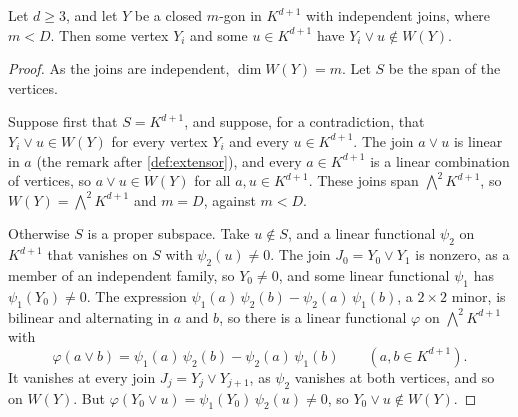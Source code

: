 \begin{lemma}
  \label{lem:pencil-d-polygon-star}
  \leanok
  Let $d \ge 3$, and let $Y$ be a closed $m$-gon in $K^{d+1}$ with
  independent joins, where $m < D$. Then some vertex $Y_i$ and some
  $u \in K^{d+1}$ have $Y_i \vee u \notin W(Y)$.
\end{lemma}
\begin{proof}
  \leanok
  As the joins are independent, $\dim W(Y) = m$. Let $S$ be the span of
  the vertices.

  Suppose first that $S = K^{d+1}$, and suppose, for a contradiction,
  that $Y_i \vee u \in W(Y)$ for every vertex $Y_i$ and every
  $u \in K^{d+1}$. The join $a \vee u$ is linear in $a$ (the remark after
  \cref{def:extensor}), and every $a \in K^{d+1}$ is a linear combination
  of vertices, so $a \vee u \in W(Y)$ for all $a, u \in K^{d+1}$. These
  joins span $\bigwedge^2 K^{d+1}$, so $W(Y) = \bigwedge^2 K^{d+1}$ and
  $m = D$, against $m < D$.

  Otherwise $S$ is a proper subspace. Take $u \notin S$, and a linear
  functional $\psi_2$ on $K^{d+1}$ that vanishes on $S$ with
  $\psi_2(u) \neq 0$. The join $J_0 = Y_0 \vee Y_1$ is nonzero, as a
  member of an independent family, so $Y_0 \neq 0$, and some linear
  functional $\psi_1$ has $\psi_1(Y_0) \neq 0$. The expression
  $\psi_1(a)\, \psi_2(b) - \psi_2(a)\, \psi_1(b)$, a $2 \times 2$ minor,
  is bilinear and alternating in $a$ and $b$, so there is a linear
  functional $\varphi$ on $\bigwedge^2 K^{d+1}$ with
  \[
    \varphi(a \vee b) = \psi_1(a)\, \psi_2(b) - \psi_2(a)\, \psi_1(b)
    \qquad (a, b \in K^{d+1}).
  \]
  It vanishes at every join $J_j = Y_j \vee Y_{j+1}$, as $\psi_2$
  vanishes at both vertices, and so on $W(Y)$. But
  $\varphi(Y_0 \vee u) = \psi_1(Y_0)\, \psi_2(u) \neq 0$, so
  $Y_0 \vee u \notin W(Y)$.
\end{proof}


